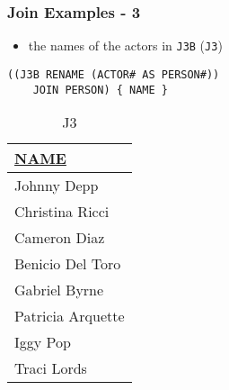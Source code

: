 \documentclass[dvipsnames]{beamer}
\theoremstyle{plain}
\begin{document}
\begin{frame}[fragile]
  \frametitle{Join Examples - 3}

  \begin{example}
    \begin{itemize}
      \item the names of the actors in \texttt{J3B} (\texttt{J3})
    \end{itemize}

    \begin{lstlisting}
((J3B RENAME (ACTOR# AS PERSON#))
    JOIN PERSON) { NAME }
    \end{lstlisting}

    \pause
    \vspace{-10pt}
    \begin{tiny}
    \begin{table}
      \caption{J3}
      \begin{tabular}{|l|}\hline
\underline{NAME} \\[2pt]\hline\hline
Johnny Depp      \\\hline
Christina Ricci  \\\hline
Cameron Diaz     \\\hline
Benicio Del Toro \\\hline
Gabriel Byrne    \\\hline
Patricia Arquette\\\hline
Iggy Pop         \\\hline
Traci Lords      \\\hline
      \end{tabular}
    \end{table}
    \end{tiny}
  \end{example}
\end{frame}
% 
% 
% 
\end{document}
